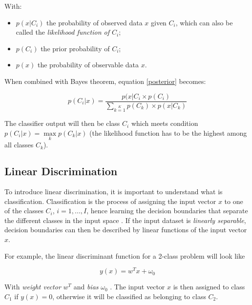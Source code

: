 \noindent With:
\begin{itemize}
\item $p(x|C_i)$ the probability of observed data $x$ given $C_i$, which can also be called the \textit{likelihood function of $C_i$};
\item $p(C_i)$ the prior probability of $C_i$;
\item $p(x)$ the probability of observable data $x$.
\end{itemize} 

\noindent When combined with Bayes theorem, equation \ref{posterior} becomes:

\begin{equation}
	p(C_i|x) = \frac{p(x|C_i \times p(C_i)}{\sum\limits_{k=1}\limits^{K} p(C_k) \times p(x|C_k)}
	\label{posterior_bayes}
\end{equation}

\noindent The classifier output will then be class $C_i$ which meets condition $p(C_i|x) = \max \limits_{k} p(C_k|x)$ (the likelihood function has to be the highest among all classes $C_k$).

\subsection{Linear Discrimination}

\vspace{\baselineskip}
\noindent To introduce linear discrimination, it is important to understand what is classification. Classification is the process of assigning the input vector $x$ to one of the classes $C_i$, $i=1, ..., I$, hence learning the decision boundaries that separate the different classes in the input space \cite{BIS06}. If the input dataset is \textit{linearly separable}, decision boundaries can then be described by linear functions of the input vector $x$.
\newline

\noindent For example, the linear discriminant function for a 2-class problem will look like 

\begin{equation}
y(x) = w^Tx + \omega_0
\end{equation}

\noindent With \textit{weight vector} $w^T$ and \textit{bias} $\omega_0$ \cite{BIS06}. The input vector $x$ is then assigned to class $C_1$ if $y(x) = 0$, otherwise it will be classified as belonging to class $C_2$.
\newline


